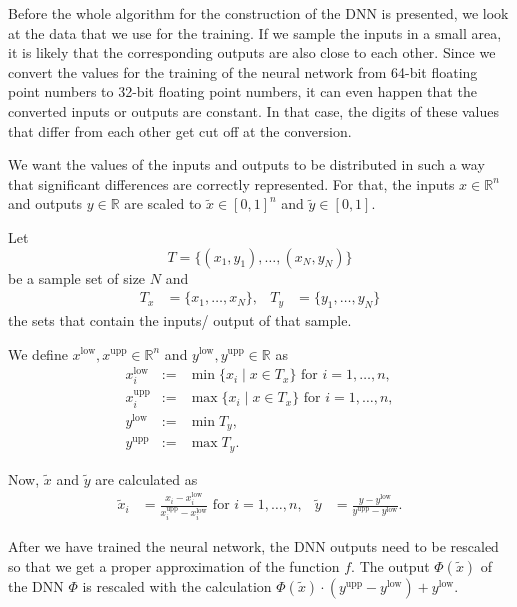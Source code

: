Before the whole algorithm for the construction of the DNN is presented, we look at the data that we use for the training. If we sample the inputs in a small area, it is likely that the corresponding outputs are also close to each other. Since we convert the values for the training of the neural network from 64-bit floating point numbers to 32-bit floating point numbers, it can even happen that the converted inputs or outputs are constant. In that case, the digits of these values that differ from each other get cut off at the conversion.

We want the values of the inputs and outputs to be distributed in such a way that significant differences are correctly represented. For that, the inputs $x\in\mathbb{R}^n$ and outputs $y\in\mathbb{R}$ are scaled to $\tilde{x}\in[0,1]^n$ and $\tilde{y}\in[0,1]$.

Let
\begin{equation}
T=\{(x_1,y_1),\dotsc,(x_N,y_N)\}
\end{equation}
be a sample set of size $N$ and
\begin{align*}
T_x&=\{x_1,\dotsc,x_N\},&T_y&=\{y_1,\dotsc,y_N\}
\end{align*}
the sets that contain the inputs/ output of that sample.

We define $x^\mathrm{low}, x^\mathrm{upp}\in\mathbb{R}^n$ and $y^\mathrm{low}, y^\mathrm{upp}\in\mathbb{R}$ as
\begin{eqnarray}
\label{minIn}
x^\mathrm{low}_i&:=&\operatorname*{min}\{x_i\mid x\in T_x\}\text{ for }i=1,\dotsc,n,\\
\label{maxIn}
x^\mathrm{upp}_i&:=&\operatorname*{max}\{x_i\mid x\in T_x\}\text{ for }i=1,\dotsc,n,\\
\label{minOut}
y^\mathrm{low}&:=&\operatorname*{min}T_y,\\
\label{maxOut}
y^\mathrm{upp}&:=&\operatorname*{max}T_y.
\end{eqnarray}

Now, $\tilde{x}$ and $\tilde{y}$ are calculated as
\begin{align}
\label{scalingToZeroOne}
\tilde{x}_i&=\frac{x_i-x^\mathrm{low}_i}{x^\mathrm{upp}_i-x^\mathrm{low}_i}\text{ for }i=1,\dotsc,n,&\tilde{y}&=\frac{y-y^\mathrm{low}}{y^\mathrm{upp}-y^\mathrm{low}}.
\end{align}

After we have trained the neural network, the DNN outputs need to be rescaled so that we get a proper approximation of the function $f$. The output $\Phi(\tilde{x})$ of the DNN $\Phi$ is rescaled with the calculation $\Phi(\tilde{x})\cdot(y^\mathrm{upp}-y^\mathrm{low})+y^\mathrm{low}$.

